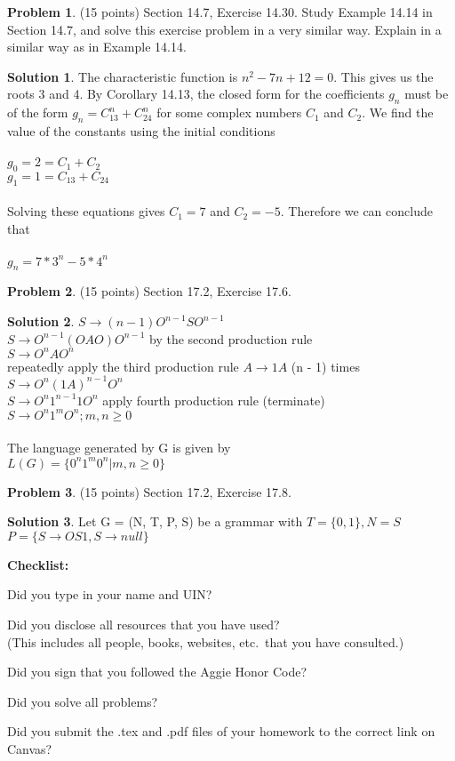 \documentclass{article}
\theoremstyle{definition}
\newtheorem{problem}{Problem}
\newtheorem*{solution}{Solution}
\newcommand{\checklist}{\noindent\textbf{Checklist:}
\begin{compactitem}[$\Box$] 
\item Did you type in your name and UIN? 
\item Did you disclose all resources that you have used? \\
(This includes all people, books, websites, etc.\ that you have consulted.)
\item Did you sign that you followed the Aggie Honor Code? 
\item Did you solve all problems? 
\item Did you submit the .tex and .pdf files of your homework to the correct link on Canvas? 
\end{compactitem}
}
\begin{document}
\begin{problem} (15 points) Section 14.7, Exercise 14.30.  Study Example 14.14
in Section 14.7, and solve this exercise problem in a very similar way.  Explain in
a similar way as in Example 14.14.
\end{problem}
\begin{solution} 
The characteristic function is $n^2 - 7n + 12 = 0$. This gives us the roots 3 and 4. By Corollary 14.13, the closed form for the coefficients $g_n$ must be of the form $g_n = C_13^n + C_24^n$ for some complex numbers $C_1$ and $C_2$. We find the value of the constants using the initial conditions \\
\\
$g_0 = 2 = C_1 + C_2$ \\
$g_1 = 1 = C_13 + C_24$ \\
\\
Solving these equations gives $C_1 = 7$ and $C_2 = -5$. Therefore we can conclude that \\
\\
$g_n = 7*3^n - 5*4^n$
\end{solution}

\begin{problem} (15 points) Section 17.2, Exercise 17.6.
\end{problem}
\begin{solution} 
$S \to (n - 1) O^{n - 1} S O^{n - 1}$ \\
$S \to O^{n - 1} (OAO) O^{n - 1}$ by the second production rule \\
$S \to O^n A O^n$ \\
repeatedly apply the third production rule $A \to 1A$ (n - 1) times \\
$S \to O^n (1A)^{n - 1} O^n$ \\
$S \to O^n 1^{n - 1} 1 O^n$ apply fourth production rule (terminate) \\
$S \to O^n 1^m O^n; m, n \geqslant 0$ \\
\\
The language generated by G is given by \\
$L(G) = \{ 0^n1^m0^n | m, n \geqslant 0 \}$
\end{solution}

\begin{problem} (15 points) Section 17.2, Exercise 17.8.
\end{problem}
\begin{solution} 
Let G = (N, T, P, S) be a grammar with $T = \{0, 1\}, N = {S}$ \\
$P = \{S \to OS1, S \to null\}$
\end{solution}

\goodbreak
\checklist
\end{document}
